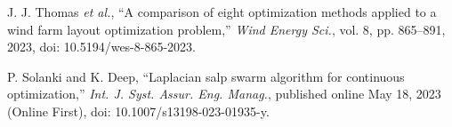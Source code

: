 

J. J. Thomas \textit{et al.}, ``A comparison of eight optimization methods applied to a wind farm layout optimization problem,'' \textit{Wind Energy Sci.}, vol. 8, pp. 865--891, 2023, doi: 10.5194/wes-8-865-2023.

P. Solanki and K. Deep, ``Laplacian salp swarm algorithm for continuous optimization,'' \textit{Int. J. Syst. Assur. Eng. Manag.}, published online May 18, 2023 (Online First), doi: 10.1007/s13198-023-01935-y.

